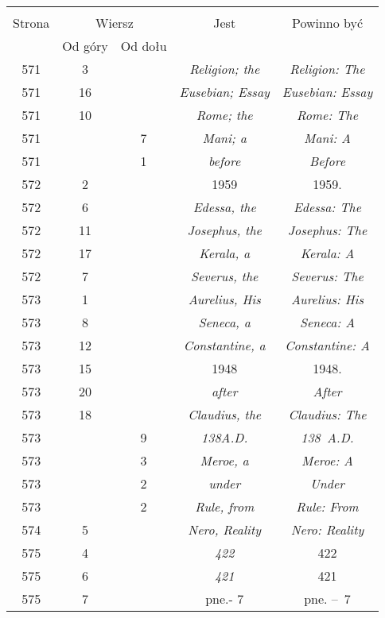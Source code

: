 \documentclass[a4paper,11pt]{article}
\begin{document}
\begin{center}
  \begin{tabular}{|c|c|c|c|c|}
    \hline
    & \multicolumn{2}{c|}{} & & \\
    Strona & \multicolumn{2}{c|}{Wiersz} & Jest
                              & Powinno być \\ \cline{2-3}
    & Od góry & Od dołu & & \\
    \hline
    571 &  3 & & \emph{Religion; the} & \emph{Religion: The} \\
    571 & 16 & & \emph{Eusebian; Essay} & \emph{Eusebian: Essay} \\
    571 & 10 & & \emph{Rome; the} & \emph{Rome: The} \\
    571 & &  7 & \emph{Mani; a} & \emph{Mani: A} \\
    571 & &  1 & \emph{before} & \emph{Before} \\
    572 &  2 & & 1959 & 1959. \\
    572 &  6 & & \emph{Edessa, the} & \emph{Edessa: The} \\
    572 & 11 & & \emph{Josephus, the} & \emph{Josephus: The} \\
    572 & 17 & & \emph{Kerala, a} & \emph{Kerala: A} \\
    572 &  7 & & \emph{Severus, the} & \emph{Severus: The} \\
    573 &  1 & & \emph{Aurelius, His} & \emph{Aurelius: His} \\
    573 &  8 & & \emph{Seneca, a} & \emph{Seneca: A} \\
    573 & 12 & & \emph{Constantine, a} & \emph{Constantine: A} \\
    573 & 15 & & 1948 & 1948. \\
    573 & 20 & & \emph{after} & \emph{After} \\
    573 & 18 & & \emph{Claudius, the} & \emph{Claudius: The} \\
    573 & &  9 & \emph{138A.D.} & \emph{138~A.D.} \\
    573 & &  3 & \emph{Meroe, a} & \emph{Meroe: A} \\
    573 & &  2 & \emph{under} & \emph{Under} \\
    573 & &  2 & \emph{Rule, from} & \emph{Rule: From} \\
    574 &  5 & & \emph{Nero, Reality} & \emph{Nero: Reality} \\
    575 &  4 & & \emph{422} & 422 \\
    575 &  6 & & \emph{421} & 421 \\
    575 &  7 & & pne.- 7 & pne. --~7 \\

\end{tabular}
\end{center}
\end{document}
